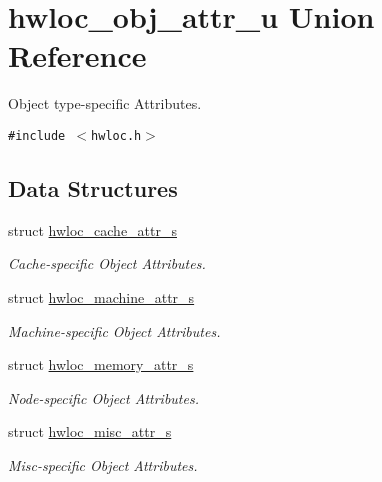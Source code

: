 \hypertarget{unionhwloc__obj__attr__u}{
\section{hwloc\_\-obj\_\-attr\_\-u Union Reference}
\label{unionhwloc__obj__attr__u}
}
Object type-specific Attributes.  


{\tt \#include $<$hwloc.h$>$}

\subsection*{Data Structures}
\begin{CompactItemize}
\item 
struct \hyperlink{structhwloc__obj__attr__u_1_1hwloc__cache__attr__s}{hwloc\_\-cache\_\-attr\_\-s}
\begin{CompactList}\small\item\em Cache-specific Object Attributes. \item\end{CompactList}\item 
struct \hyperlink{structhwloc__obj__attr__u_1_1hwloc__machine__attr__s}{hwloc\_\-machine\_\-attr\_\-s}
\begin{CompactList}\small\item\em Machine-specific Object Attributes. \item\end{CompactList}\item 
struct \hyperlink{structhwloc__obj__attr__u_1_1hwloc__memory__attr__s}{hwloc\_\-memory\_\-attr\_\-s}
\begin{CompactList}\small\item\em Node-specific Object Attributes. \item\end{CompactList}\item 
struct \hyperlink{structhwloc__obj__attr__u_1_1hwloc__misc__attr__s}{hwloc\_\-misc\_\-attr\_\-s}
\begin{CompactList}\small\item\em Misc-specific Object Attributes. \item\end{CompactList}\end{CompactItemize}
